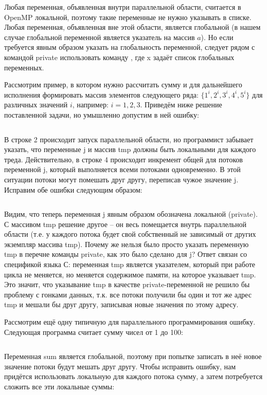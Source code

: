 Любая переменная, объявленная внутри параллельной области, считается в OpenMP локальной, поэтому такие переменные не нужно указывать в списке. Любая переменная, объявленная вне этой области, является глобальной (в нашем случае глобальной переменной является указатель на массив $a$). Но если требуется явным образом указать на глобальность переменной, следует рядом с командой private использовать команду , где x задаёт список глобальных переменных.

Рассмотрим пример, в котором нужно рассчитать сумму и для дальнейшего исполнения формировать массив элементов следующего ряда: $\{1^i, 2^i, 3^i, 4^i, 5^i\}$ для различных значений $i$, например: $i = 1, 2, 3$. Приведём ниже решение поставленной задачи, но умышленно допустим в ней ошибку:

\inputminted{c++}{listings/OpenMPExample8.cpp}

В строке 2 происходит запуск параллельной области, но программист забывает указать, что переменные j и массив tmp должны быть локальными для каждого треда. Действительно, в строке 4 происходит инкремент общей для потоков переменной j, который выполняется всеми потоками одновременно. В этой ситуации потоки могут помешать друг другу, переписав чужое значение j. Исправим обе ошибки следующим образом:

\inputminted{c++}{listings/OpenMPExample9.cpp}

Видим, что теперь переменная j явным образом обозначена локальной (private). С массивом tmp решение другое – он весь помещается внутрь параллельной области (т.е. у каждого потока будет свой собственный не зависимый от других экземпляр массива tmp). Почему же нельзя было просто указать переменную tmp в перечне команды private, как это было сделано для j? Ответ связан со спецификой языка С: переменная tmp является указателем, который при работе цикла не меняется, но меняется содержимое памяти, на которое указывает tmp. Это значит, что указывание tmp в качестве private-переменной не решило бы проблему с гонками данных, т.к. все потоки получили бы один и тот же адрес tmp и мешали бы друг другу, записывая новые значения по этому адресу.

Рассмотрим ещё одну типичную для параллельного программирования ошибку. Следующая программа считает сумму чисел от 1 до 100:

\inputminted{c++}{listings/OpenMPExample10.cpp}

Переменная sum является глобальной, поэтому при попытке записать в неё новое значение потоки будут мешать друг другу. Чтобы исправить ошибку, нам придётся использовать локальную для каждого потока сумму, а затем потребуется сложить все эти локальные суммы:

